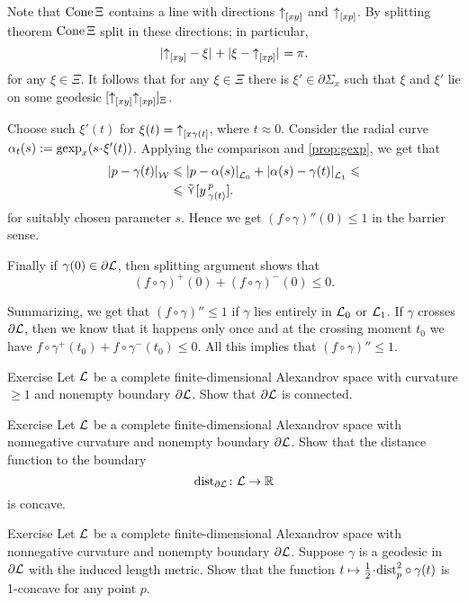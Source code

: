 Note that $\mathop{\rm Cone}\nolimits \Xi$ contains a line with directions ${\uparrow}_{[{x}{y}]}$ and ${\uparrow}_{[{x}{p}]}$.
By splitting theorem $\mathop{\rm Cone}\nolimits \Xi$ split in these directions;
in particular, 
\[\dist{\dir x{y}}{\xi}{}+\dist{\xi}{\dir xp}{}=\pi.\]
for any $\xi\in\Xi$.
It follows that for any $\xi\in\Xi$ there is $\xi'\in\partial\Sigma_x$ such that 
$\xi$ and $\xi'$ lie on some geodesic $[{\uparrow}_{[{x}{y}]} {\uparrow}_{[{x}{p}]}]_\Xi$.

Choose such $\xi'(t)$ for $\xi(t)={\uparrow}_{[{x}{\gamma(t}]}$, where $t\approx 0$.
Consider the radial curve $\alpha_t(s)\df\gexp_x(s\cdot\xi'(t))$.
Applying the comparison and \ref{prop:gexp}, we get that 
\begin{align*}
\dist{p}{\gamma(t)}{\spc{W}}
&\le \dist{p}{\alpha(s)}{\spc{L}_0}+ \dist{\alpha(s)}{\gamma(t)}{\spc{L}_1}\le
\\
&\le \side\hinge yp{\gamma(t)}.
\end{align*}
for suitably chosen parameter $s$. 
Hence we get $(f\circ\gamma)''(0)\le 1$ in the barrier sense.

Finally if $\gamma(0)\in\partial\mathcal{L}$, then splitting argument shows that 
\[(f\circ\gamma)^+(0)+(f\circ\gamma)^-(0)\le 0.\]

Summarizing, we get that $(f\circ\gamma)''\le 1$ if $\gamma$ lies entirely in $\mathcal{L}_0$ or $\mathcal{L}_1$.
If $\gamma$ crosses $\partial \mathcal{L}$, then we know that it happens only once and at the crossing moment $t_0$ 
we have $f\circ\gamma^+(t_0)+f\circ\gamma^-(t_0)\le 0$.
All this implies that $(f\circ\gamma)''\le 1$.
\qeds

\begin{thm}{Exercise}\label{ex:bry-connected}
Let $\mathcal{L}$ be a complete finite-dimensional Alexandrov space with curvature $\ge 1$ and nonempty boundary $\partial\mathcal{L}$.
Show that $\partial\mathcal{L}$ is connected.
\end{thm}


\begin{thm}{Exercise}\label{ex:dist-to-bry}
Let $\mathcal{L}$ be a complete finite-dimensional Alexandrov space with nonnegative curvature and nonempty boundary $\partial\mathcal{L}$.
Show that the distance function to the boundary
\[\mathrm{dist}_{\partial\mathcal{L}}\colon\mathcal{L}\to\mathbb{R}\]
is concave.
\end{thm}

\begin{thm}{Exercise}\label{ex:liberman}
Let $\mathcal{L}$ be a complete finite-dimensional Alexandrov space with nonnegative curvature and nonempty boundary $\partial\mathcal{L}$.
Suppose $\gamma$ is a geodesic in $\partial\mathcal{L}$ with the induced length metric.
Show that the function $t\mapsto \tfrac12\cdot\distfun_p^2\circ\gamma(t)$ is 1-concave for any point $p$. 
\end{thm}

